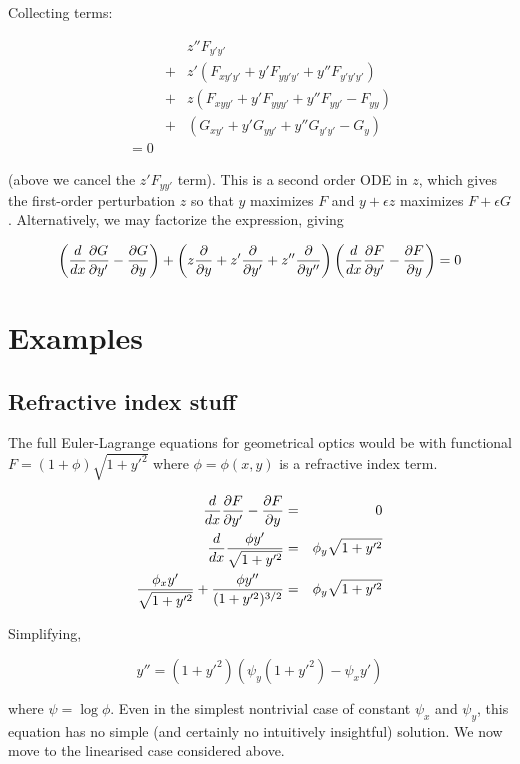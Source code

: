 \documentclass[pdflatex,sn-mathphys-num]{sn-jnl}%
\theoremstyle{thmstyleone}%
\theoremstyle{thmstyletwo}%
\theoremstyle{thmstylethree}%
\begin{document}
Collecting terms:

\begin{eqnarray}
&{}& z''F_{y'y'}\\
&+& z'(F_{xy'y'} + y'F_{yy'y'} + y''F_{y'y'y'})\\
&+& z (F_{xyy'} + y'F_{yyy'} + y''F_{yy'}-F_{yy})\\
&+& (G_{xy'} + y'G_{yy'} + y''G_{y'y'}- G_{y})\\
= 0
\end{eqnarray}

(above we cancel the $z'F_{yy'}$ term). This is a second order ODE in
$z$, which gives the first-order perturbation $z$ so that $y$
maximizes $F$ and $y+\epsilon z$ maximizes $F+\epsilon G$.
Alternatively, we may factorize the expression, giving

\begin{equation}
\left(\frac{d}{dx}\frac{\partial{G}}{\partial{y'}} - \frac{\partial{G}}{\partial{y}}\right) + \left(z\frac{\partial{}}{\partial{y}} + z'\frac{\partial{}}{\partial{y'}} + z''\frac{\partial{}}{\partial{y''}}\right)
\left(\frac{d}{dx}\frac{\partial{F}}{\partial{y'}} - \frac{\partial{F}}{\partial{y}}\right)=0
\end{equation}

\section{Examples}

\subsection{Refractive index stuff}

The full Euler-Lagrange equations for geometrical optics would be with
functional $F=(1+\phi)\sqrt{1+y'^2}$ where $\phi=\phi(x,y)$ is a
refractive index term.

\begin{eqnarray}
  \frac{d}{dx}\frac{\partial{F}}{\partial{y'}}-\frac{\partial{F}}{\partial{y}} &=& 0\\
  \frac{d}{dx}\frac{\phi y'}{\sqrt{1+y'^2}} &=& \phi_y\sqrt{1+y'^2}\\
  \frac{\phi_x y'}{\sqrt{1+y'^2}}+\frac{\phi y''}{(1+y'^2)^{3/2}} &=& \phi_y\sqrt{1+y'^2}
  \end{eqnarray}

Simplifying,

\begin{equation}
  y'' = (1+y'^2)(\psi_y(1+y'^2) - \psi_xy')
\end{equation}

where $\psi=\log\phi$.  Even in the simplest nontrivial case of
constant $\psi_x$ and $\psi_y$, this equation has no simple (and
certainly no intuitively insightful) solution.  We now move to the
linearised case considered above.
\end{document}
